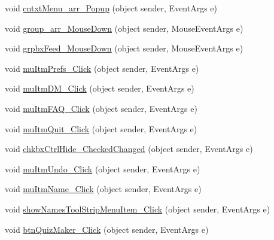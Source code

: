 \begin{DoxyCompactItemize}
\item 
void \hyperlink{class_sr_p___classroom_inq_1_1frm_classrrom_inq_acfeb1a732384a5847d78b3a061704098}{cntxt\-Menu\-\_\-arr\-\_\-\-Popup} (object sender, \-Event\-Args e)
\item 
void \hyperlink{class_sr_p___classroom_inq_1_1frm_classrrom_inq_a405c06879d3fcaef6c06fae80d320385}{group\-\_\-arr\-\_\-\-Mouse\-Down} (object sender, \-Mouse\-Event\-Args e)
\item 
void \hyperlink{class_sr_p___classroom_inq_1_1frm_classrrom_inq_ab291bba130fa54333ca1102880c3de9d}{grpbx\-Feed\-\_\-\-Mouse\-Down} (object sender, \-Mouse\-Event\-Args e)
\item 
void \hyperlink{class_sr_p___classroom_inq_1_1frm_classrrom_inq_a8d958123049b9831c795fc69846a4361}{mu\-Itm\-Prefs\-\_\-\-Click} (object sender, \-Event\-Args e)
\item 
void \hyperlink{class_sr_p___classroom_inq_1_1frm_classrrom_inq_a98c9af062defe91100614c630cd15e27}{mu\-Itm\-D\-M\-\_\-\-Click} (object sender, \-Event\-Args e)
\item 
void \hyperlink{class_sr_p___classroom_inq_1_1frm_classrrom_inq_ab4caa4c9e3362eca229979be7b7ae43a}{mu\-Itm\-F\-A\-Q\-\_\-\-Click} (object sender, \-Event\-Args e)
\item 
void \hyperlink{class_sr_p___classroom_inq_1_1frm_classrrom_inq_ac56c218b454f6a866f9248172c9500f4}{mu\-Itm\-Quit\-\_\-\-Click} (object sender, \-Event\-Args e)
\item 
void \hyperlink{class_sr_p___classroom_inq_1_1frm_classrrom_inq_ad624d08811b6ddb3384fddb6225d3ce3}{chkbx\-Ctrl\-Hide\-\_\-\-Checked\-Changed} (object sender, \-Event\-Args e)
\item 
void \hyperlink{class_sr_p___classroom_inq_1_1frm_classrrom_inq_ab510dcfe5ebb7cf0c943058612fcb54a}{mu\-Itm\-Undo\-\_\-\-Click} (object sender, \-Event\-Args e)
\item 
void \hyperlink{class_sr_p___classroom_inq_1_1frm_classrrom_inq_a2c699284eac06317a97faee9e5f305e5}{mu\-Itm\-Name\-\_\-\-Click} (object sender, \-Event\-Args e)
\item 
void \hyperlink{class_sr_p___classroom_inq_1_1frm_classrrom_inq_ad063fc4ba674b7e7e76eb12d6e5b3063}{show\-Names\-Tool\-Strip\-Menu\-Item\-\_\-\-Click} (object sender, \-Event\-Args e)
\item 
void \hyperlink{class_sr_p___classroom_inq_1_1frm_classrrom_inq_a8d440d379253fa5479a3b89ef54db5bf}{btn\-Quiz\-Maker\-\_\-\-Click} (object sender, \-Event\-Args e)
\item 

\end{DoxyCompactItemize}
